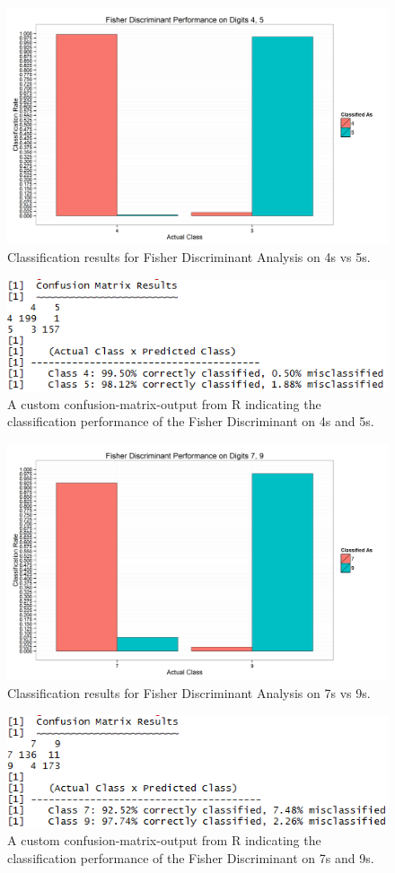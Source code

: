 \documentclass{article}
\begin{document}
\begin{figure}[h!]
  \centering
  \includegraphics[width=.8\linewidth]{Fisher_Discriminant_Performance_on_Digits_4,_5}
  \caption{Classification results for Fisher Discriminant Analysis on 4s vs 5s.}
  \label{fig:4_5_bar}
\end{figure}
\begin{figure}[h!]
  \centering
  \includegraphics[width=.8\linewidth]{4_5_confusion}
  \caption{A custom confusion-matrix-output from R indicating the classification performance of the Fisher Discriminant on 4s and 5s.}
  \label{fig:4_5_confusion}
\end{figure}
%
\newpage
\begin{figure}[h!]
  \centering
  \includegraphics[width=.8\linewidth]{Fisher_Discriminant_Performance_on_Digits_7,_9}
  \caption{Classification results for Fisher Discriminant Analysis on 7s vs 9s.}
  \label{fig:7_9_bar}
\end{figure}
\begin{figure}[h!]
  \centering
  \includegraphics[width=.8\linewidth]{7_9_confusion}
  \caption{A custom confusion-matrix-output from R indicating the classification performance of the Fisher Discriminant on 7s and 9s.}
  \label{fig:7_9_confusion}
\end{figure}
\end{document}
